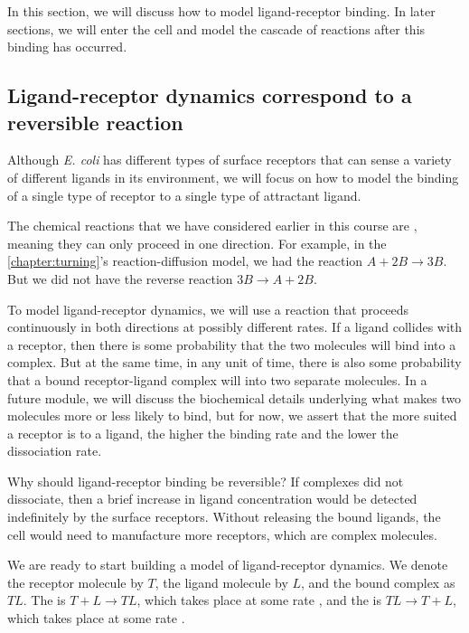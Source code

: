 In this section, we will discuss how to model ligand-receptor binding. In later sections, we will enter the cell and model the cascade of reactions after this binding has occurred.

\FloatBarrier
{}
\subsection{Ligand-receptor dynamics correspond to a reversible reaction}

Although \textit{E. coli} has different types of surface receptors that can sense a variety of different ligands in its environment, we will focus on how to model the binding of a single type of receptor to a single type of attractant ligand.

The chemical reactions that we have considered earlier in this course are , meaning they can only proceed in one direction. For example, in the \autoref{chapter:turning}'s reaction-diffusion model, we had the reaction $A + 2B \rightarrow 3B$. But we did not have the reverse reaction $3B \rightarrow A + 2B$.

To model ligand-receptor dynamics, we will use a  reaction that proceeds continuously in both directions at possibly different rates. If a ligand collides with a receptor, then there is some probability that the two molecules will bind into a complex. But at the same time, in any unit of time, there is also some probability that a bound receptor-ligand complex will  into two separate molecules. In a future module, we will discuss the biochemical details underlying what makes two molecules more or less likely to bind, but for now, we assert that the more suited a receptor is to a ligand, the higher the binding rate and the lower the dissociation rate.

Why should ligand-receptor binding be reversible? If complexes did not dissociate, then a brief increase in ligand concentration would be detected indefinitely by the surface receptors. Without releasing the bound ligands, the cell would need to manufacture more receptors, which are complex molecules.

We are ready to start building a model of ligand-receptor dynamics. We denote the receptor molecule by $T$, the ligand molecule by $L$, and the bound complex as $TL$. The  is $T + L \rightarrow TL$, which takes place at some rate , and the  is $TL \rightarrow T + L$, which takes place at some rate .

